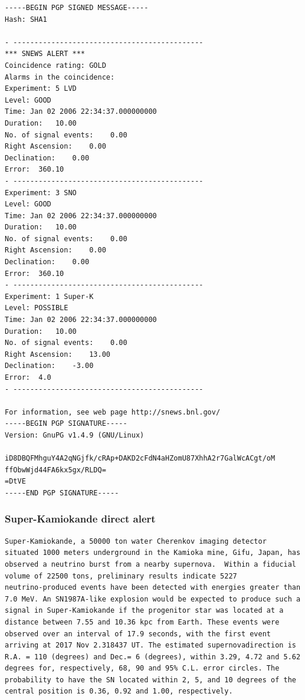\documentclass[11pt]{article}
\begin{document}
\begin{verbatim}
-----BEGIN PGP SIGNED MESSAGE-----
Hash: SHA1

- ---------------------------------------------
*** SNEWS ALERT ***
Coincidence rating: GOLD
Alarms in the coincidence:
Experiment: 5 LVD
Level: GOOD
Time: Jan 02 2006 22:34:37.000000000
Duration:   10.00
No. of signal events:    0.00
Right Ascension:    0.00
Declination:    0.00
Error:  360.10
- ---------------------------------------------
Experiment: 3 SNO
Level: GOOD 
Time: Jan 02 2006 22:34:37.000000000
Duration:   10.00
No. of signal events:    0.00
Right Ascension:    0.00
Declination:    0.00
Error:  360.10
- ---------------------------------------------
Experiment: 1 Super-K
Level: POSSIBLE 
Time: Jan 02 2006 22:34:37.000000000
Duration:   10.00
No. of signal events:    0.00
Right Ascension:    13.00
Declination:    -3.00
Error:  4.0
- ---------------------------------------------

For information, see web page http://snews.bnl.gov/
-----BEGIN PGP SIGNATURE-----
Version: GnuPG v1.4.9 (GNU/Linux)

iD8DBQFMhguY4A2qNGjfk/cRAp+DAKD2cFdN4aHZomU87XhhA2r7GalWcACgt/oM
ffObwWjd44FA6kx5gx/RLDQ=
=DtVE
-----END PGP SIGNATURE-----
\end{verbatim}


\subsubsection{Super-Kamiokande direct alert}

\begin{verbatim}
Super-Kamiokande, a 50000 ton water Cherenkov imaging detector
situated 1000 meters underground in the Kamioka mine, Gifu, Japan, has
observed a neutrino burst from a nearby supernova.  Within a fiducial
volume of 22500 tons, preliminary results indicate 5227
neutrino-produced events have been detected with energies greater than
7.0 MeV. An SN1987A-like explosion would be expected to produce such a
signal in Super-Kamiokande if the progenitor star was located at a
distance between 7.55 and 10.36 kpc from Earth. These events were
observed over an interval of 17.9 seconds, with the first event
arriving at 2017 Nov 2.318437 UT. The estimated supernovadirection is
R.A. = 110 (degrees) and Dec.= 6 (degrees), within 3.29, 4.72 and 5.62
degrees for, respectively, 68, 90 and 95% C.L. error circles. The
probability to have the SN located within 2, 5, and 10 degrees of the
central position is 0.36, 0.92 and 1.00, respectively.
\end{verbatim}
\end{document}
